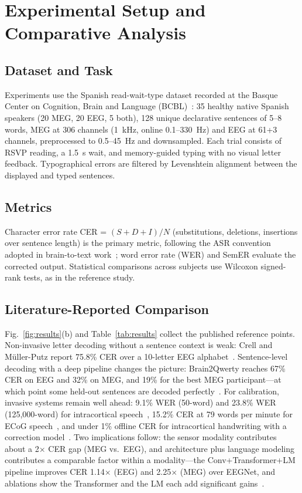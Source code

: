 \documentclass[conference]{IEEEtran}
\begin{document}
\section{Experimental Setup and Comparative Analysis}

\subsection{Dataset and Task}
Experiments use the Spanish read-wait-type dataset recorded at the Basque
Center on Cognition, Brain and Language (BCBL)~\cite{levy2025,zhang2025hierarchy}:
35 healthy native Spanish speakers (20 MEG, 20 EEG, 5 both), 128 unique
declarative sentences of 5--8 words, MEG at 306 channels (1~kHz, online
0.1--330~Hz) and EEG at 61+3 channels, preprocessed to 0.5--45~Hz and
downsampled. Each trial consists of RSVP reading, a 1.5~s wait, and
memory-guided typing with no visual letter feedback. Typographical errors
are filtered by Levenshtein alignment between the displayed and typed
sentences.

\subsection{Metrics}
Character error rate CER = $(S+D+I)/N$ (substitutions, deletions, insertions
over sentence length) is the primary metric, following the ASR convention
adopted in brain-to-text work~\cite{levy2025,willett2021}; word error rate
(WER) and SemER evaluate the corrected output. Statistical comparisons
across subjects use Wilcoxon signed-rank tests, as in the reference study.

\subsection{Literature-Reported Comparison}
Fig.~\ref{fig:results}(b) and Table~\ref{tab:results} collect the published
reference points. Non-invasive letter decoding without a sentence context is
weak: Crell and M\"uller-Putz report 75.8\% CER over a 10-letter EEG
alphabet~\cite{crell2024}. Sentence-level decoding with a deep pipeline
changes the picture: Brain2Qwerty reaches 67\% CER on EEG and 32\% on MEG,
and 19\% for the best MEG participant---at which point some held-out
sentences are decoded perfectly~\cite{levy2025}. For calibration, invasive
systems remain well ahead: 9.1\% WER (50-word) and 23.8\% WER
(125,000-word) for intracortical speech~\cite{willett2023}, 15.2\% CER at 79
words per minute for ECoG speech~\cite{metzger2023}, and under 1\% offline
CER for intracortical handwriting with a correction model~\cite{willett2021}.
Two implications follow: the sensor modality contributes about a 2$\times$
CER gap (MEG vs.\ EEG), and architecture plus language modeling contributes
a comparable factor within a modality---the Conv+Transformer+LM pipeline
improves CER 1.14$\times$ (EEG) and 2.25$\times$ (MEG) over EEGNet, and
ablations show the Transformer and the LM each add significant
gains~\cite{levy2025}.
\end{document}
